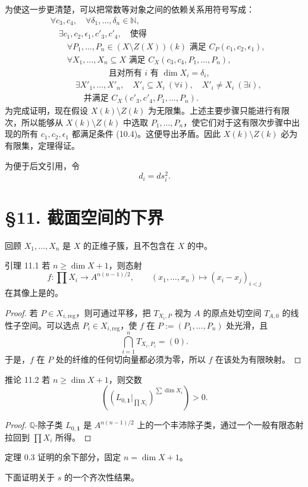 为使这一步更清楚，可以把常数等对象之间的依赖关系用符号写成：
\begin{equation*}
\begin{aligned}
&\forall c_3,c_4,\quad\forall\delta_1,\ldots,\delta_n\in\mathbb N,\\
&\quad\exists c_1,c_2,\epsilon_1,c'_3,c'_4,\quad\text{使得}\\
&\qquad\forall P_1,\ldots,P_n\in(X\setminus Z(X))(k)
\text{ 满足 }C_P(c_1,c_2,\epsilon_1),\\
&\qquad\forall X_1,\ldots,X_n\subseteq X
\text{ 满足 }C_X(c_3,c_4,P_1,\ldots,P_n),\\
&\qquad\hspace{5em}\text{且对所有 }i\text{ 有 }\dim X_i=\delta_i,\\
&\qquad\quad\exists X'_1,\ldots,X'_n,\quad
 X'_i\subseteq X_i\ (\forall i),\quad X'_i\ne X_i\ (\exists i),\\
&\qquad\qquad\text{并满足 }C_X(c'_3,c'_4,P_1,\ldots,P_n).
\end{aligned}\tag{10.8}
\end{equation*}
为完成证明，现在假设 $X(k)\setminus Z(k)$ 为无限集。上述主要步骤只能进行有限次，所以能够从 $X(k)\setminus Z(k)$ 中选取 $P_1,\ldots,P_n$，使它们对于这有限次步骤中出现的所有 $c_1,c_2,\epsilon_1$ 都满足条件 (10.4)。这便导出矛盾。因此 $X(k)\setminus Z(k)$ 必为有限集，定理得证。

为便于后文引用，令
\begin{equation*}
d_i=ds_i^2.\tag{10.9}
\end{equation*}

\section*{§11. 截面空间的下界}
回顾 $X_1,\ldots,X_n$ 是 $X$ 的正维子簇，且不包含在 $X$ 的中。
\begin{statement}{引理 11.1}
若 $n\ge\dim X+1$，则态射
\[
f:\prod X_i\longrightarrow A^{n(n-1)/2},\qquad
(x_1,\ldots,x_n)\longmapsto(x_i-x_j)_{i<j}
\]
在其像上是的。
\end{statement}
\begin{proof}
若 $P\in X_{i,\mathrm{reg}}$，则可通过平移，把 $T_{X_i,P}$ 视为 $A$ 的原点处切空间 $T_{A,0}$ 的线性子空间。可以选点 $P_i\in X_{i,\mathrm{reg}}$，使 $f$ 在 $P:=(P_1,\ldots,P_n)$ 处光滑，且
\[
\bigcap_{i=1}^nT_{X_i,P_i}=(0).
\]
于是，$f$ 在 $P$ 处的纤维的任何切向量都必须为零，所以 $f$ 在该处为有限映射。
\end{proof}
\begin{statement}{推论 11.2}
若 $n\ge\dim X+1$，则交数
\[
\left(\left(L_{0,\boldsymbol1}|_{\prod X_i}\right)^{\sum\dim X_i}\right)>0.
\]
\end{statement}
\begin{proof}
$\mathbb Q$-除子类 $L_{0,\boldsymbol1}$ 是 $A^{n(n-1)/2}$ 上的一个丰沛除子类，通过一个一般有限态射拉回到 $\prod X_i$ 所得。
\end{proof}
定理 0.3 证明的余下部分，固定 $n=\dim X+1$。

下面证明关于 $s$ 的一个齐次性结果。
